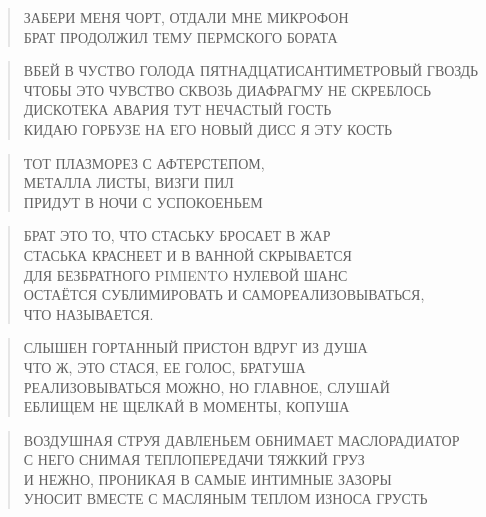 \poemtitle{***}
\begin{verse}
ЗАБЕРИ МЕНЯ ЧОРТ, ОТДАЛИ МНЕ МИКРОФОН\\
БРАТ ПРОДОЛЖИЛ ТЕМУ ПЕРМСКОГО БОРАТА
\end{verse}

\poemtitle{***}
\begin{verse}
ВБЕЙ В ЧУСТВО ГОЛОДА ПЯТНАДЦАТИСАНТИМЕТРОВЫЙ ГВОЗДЬ\\
ЧТОБЫ ЭТО ЧУВСТВО СКВОЗЬ ДИАФРАГМУ НЕ СКРЕБЛОСЬ\\
ДИСКОТЕКА АВАРИЯ ТУТ НЕЧАСТЫЙ ГОСТЬ\\
КИДАЮ ГОРБУЗЕ НА ЕГО НОВЫЙ ДИСС Я ЭТУ КОСТЬ
\end{verse}

\poemtitle{***}
\begin{verse}
ТОТ ПЛАЗМОРЕЗ С АФТЕРСТЕПОМ,\\
МЕТАЛЛА ЛИСТЫ, ВИЗГИ ПИЛ\\
ПРИДУТ В НОЧИ С УСПОКОЕНЬЕМ
\end{verse}

\poemtitle{***}
\begin{verse}
БРАТ ЭТО ТО, ЧТО СТАСЬКУ БРОСАЕТ В ЖАР\\
СТАСЬКА КРАСНЕЕТ И В ВАННОЙ СКРЫВАЕТСЯ\\
ДЛЯ БЕЗБРАТНОГО PIMIENTO НУЛЕВОЙ ШАНС\\
ОСТАЁТСЯ СУБЛИМИРОВАТЬ И САМОРЕАЛИЗОВЫВАТЬСЯ,\\
                  ЧТО НАЗЫВАЕТСЯ.
\end{verse}

\poemtitle{***}
\begin{verse}
СЛЫШЕН ГОРТАННЫЙ ПРИСТОН ВДРУГ ИЗ ДУША\\
ЧТО Ж, ЭТО СТАСЯ, ЕЕ ГОЛОС, БРАТУША\\
РЕАЛИЗОВЫВАТЬСЯ МОЖНО, НО ГЛАВНОЕ, СЛУШАЙ\\
ЕБЛИЩЕМ НЕ ЩЕЛКАЙ В МОМЕНТЫ, КОПУША
\end{verse}

\poemtitle{***}
\begin{verse}
ВОЗДУШНАЯ СТРУЯ ДАВЛЕНЬЕМ ОБНИМАЕТ МАСЛОРАДИАТОР\\
С НЕГО СНИМАЯ ТЕПЛОПЕРЕДАЧИ ТЯЖКИЙ ГРУЗ\\
И НЕЖНО, ПРОНИКАЯ В САМЫЕ ИНТИМНЫЕ ЗАЗОРЫ\\
УНОСИТ ВМЕСТЕ С МАСЛЯНЫМ ТЕПЛОМ ИЗНОСА ГРУСТЬ
\end{verse}

